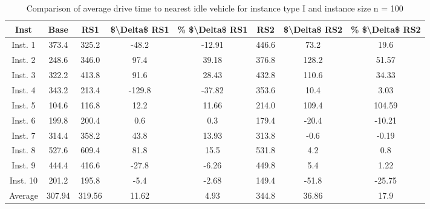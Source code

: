 \begin{table}[H]
\centering
\begin{tabular}{cccccccc}
  \hline
  \textbf{Inst} & \textbf{Base} & \textbf{RS1} & \textbf{\$\textbackslash{}Delta\$  RS1} & \textbf{\% \$\textbackslash{}Delta\$  RS1} & \textbf{RS2} & \textbf{\$\textbackslash{}Delta\$  RS2} & \textbf{\% \$\textbackslash{}Delta\$  RS2} \\\hline
  Inst. 1 & 373.4 & 325.2 & -48.2 & -12.91 & 446.6 & 73.2 & 19.6 \\
  Inst. 2 & 248.6 & 346.0 & 97.4 & 39.18 & 376.8 & 128.2 & 51.57 \\
  Inst. 3 & 322.2 & 413.8 & 91.6 & 28.43 & 432.8 & 110.6 & 34.33 \\
  Inst. 4 & 343.2 & 213.4 & -129.8 & -37.82 & 353.6 & 10.4 & 3.03 \\
  Inst. 5 & 104.6 & 116.8 & 12.2 & 11.66 & 214.0 & 109.4 & 104.59 \\
  Inst. 6 & 199.8 & 200.4 & 0.6 & 0.3 & 179.4 & -20.4 & -10.21 \\
  Inst. 7 & 314.4 & 358.2 & 43.8 & 13.93 & 313.8 & -0.6 & -0.19 \\
  Inst. 8 & 527.6 & 609.4 & 81.8 & 15.5 & 531.8 & 4.2 & 0.8 \\
  Inst. 9 & 444.4 & 416.6 & -27.8 & -6.26 & 449.8 & 5.4 & 1.22 \\
  Inst. 10 & 201.2 & 195.8 & -5.4 & -2.68 & 149.4 & -51.8 & -25.75 \\
  Average & 307.94 & 319.56 & 11.62 & 4.93 & 344.8 & 36.86 & 17.9 \\\hline
\end{tabular}
\caption{Comparison of average drive time to nearest idle vehicle for instance type I and instance size n = 100}
\label{tab:wait:resrelocation-nearest-drive-time-comparison_I_100}
\end{table}
